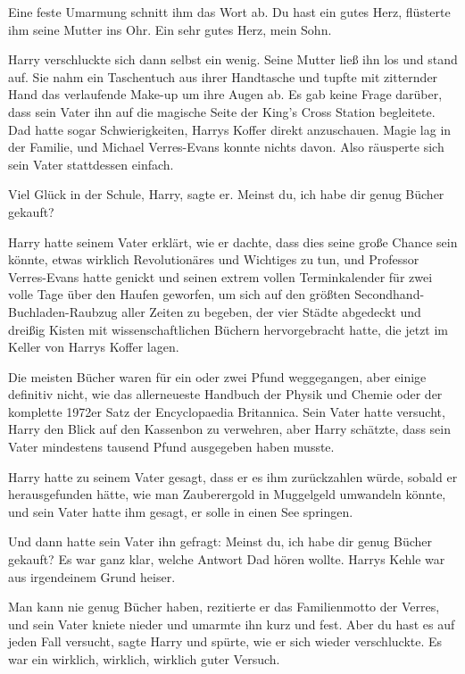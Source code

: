Eine feste Umarmung schnitt ihm das Wort ab. \glqq{}Du hast ein gutes
Herz\grqq{}, flüsterte ihm seine Mutter ins Ohr. \glqq{}Ein sehr gutes Herz,
mein Sohn.\grqq{}

Harry verschluckte sich dann selbst ein wenig. Seine Mutter ließ ihn los und
stand auf. Sie nahm ein Taschentuch aus ihrer Handtasche und tupfte mit
zitternder Hand das verlaufende Make-up um ihre Augen ab. Es gab keine Frage
darüber, dass sein Vater ihn auf die magische Seite der King's Cross Station
begleitete. Dad hatte sogar Schwierigkeiten, Harrys Koffer direkt anzuschauen.
Magie lag in der Familie, und Michael Verres-Evans konnte nichts davon. Also
räusperte sich sein Vater stattdessen einfach.

\glqq{}Viel Glück in der Schule, Harry\grqq{}, sagte er. \glqq{}Meinst du, ich
habe dir genug Bücher gekauft?\grqq{}

Harry hatte seinem Vater erklärt, wie er dachte, dass dies seine große Chance
sein könnte, etwas wirklich Revolutionäres und Wichtiges zu tun, und Professor
Verres-Evans hatte genickt und seinen extrem vollen Terminkalender für zwei
volle Tage über den Haufen geworfen, um sich auf den größten
Secondhand-Buchladen-Raubzug aller Zeiten zu begeben, der vier Städte abgedeckt
und dreißig Kisten mit wissenschaftlichen Büchern hervorgebracht hatte, die
jetzt im Keller von Harrys Koffer lagen.

Die meisten Bücher waren für ein oder zwei Pfund weggegangen, aber einige
definitiv nicht, wie das allerneueste \glqq{}Handbuch der Physik und
Chemie\grqq{} oder der komplette 1972er Satz der \glqq{}Encyclopaedia
Britannica\grqq{}. Sein Vater hatte versucht, Harry den Blick auf den Kassenbon
zu verwehren, aber Harry schätzte, dass sein Vater mindestens tausend Pfund
ausgegeben haben musste.

Harry hatte zu seinem Vater gesagt, dass er es ihm zurückzahlen würde, sobald er
herausgefunden hätte, wie man Zauberergold in Muggelgeld umwandeln könnte, und
sein Vater hatte ihm gesagt, er solle in einen See springen.

Und dann hatte sein Vater ihn gefragt: Meinst du, ich habe dir genug Bücher
gekauft? Es war ganz klar, welche Antwort Dad hören wollte. Harrys Kehle war aus
irgendeinem Grund heiser.

\glqq{}Man kann nie genug Bücher haben\grqq{}, rezitierte er das Familienmotto
der Verres, und sein Vater kniete nieder und umarmte ihn kurz und fest. \glqq
Aber du hast es auf jeden Fall versucht\grqq{}, sagte Harry und spürte, wie er
sich wieder verschluckte. \glqq{}Es war ein wirklich, wirklich, wirklich guter
Versuch.\grqq{}

